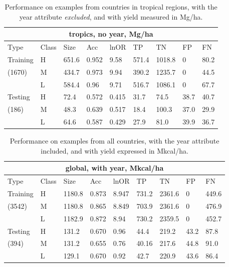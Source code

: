 \documentclass[12pt]{article}
\begin{document}
\begin{table}[h!]
\centering
\begin{tabular}{lllllllll}
\toprule
\multicolumn{9}{c}{\textbf{tropics, no year, Mg/ha}} \\
\midrule
Type & Class & Size & Acc & lnOR & TP & TN & FP & FN \\
\midrule
Training & H & 651.6 & 0.952 & 9.58 & 571.4 & 1018.8 & 0 & 80.2  \\
(1670) & M & 434.7 & 0.973 & 9.94 & 390.2 & 1235.7 & 0 & 44.5  \\
& L & 584.4 & 0.96 & 9.71 & 516.7 & 1086.1 & 0 & 67.7  \\
Testing & H & 72.4 & 0.572 & 0.415 & 31.7 & 74.5 & 38.7 & 40.7  \\
(186) & M & 48.3 & 0.639 & 0.517 & 18.4 & 100.3 & 37.0 & 29.9  \\
& L & 64.6 & 0.587 & 0.429 & 27.9 & 81.0 & 39.9 & 36.7  \\
\bottomrule
\end{tabular}
\caption{Performance on examples from countries in tropical regions, with the year attribute \emph{excluded}, and with yield measured in Mg/ha.}
\label{t.ny.trop_results}
\end{table}

\begin{table}[h!]
\centering
\begin{tabular}{lllllllll}
\toprule
\multicolumn{9}{c}{\textbf{global, with year, Mkcal/ha}} \\
\midrule
Type & Class & Size & Acc & lnOR & TP & TN & FP & FN \\
\midrule
Training & H & 1180.8 & 0.873 & 8.947 & 731.2 & 2361.6 & 0 & 449.6  \\
(3542) & M & 1180.8 & 0.865 & 8.849 & 703.9 & 2361.6 & 0 & 476.9  \\
& L & 1182.9 & 0.872 & 8.94 & 730.2 & 2359.5 & 0 & 452.7  \\
Testing & H & 131.2 & 0.670 & 0.96 & 44.4 & 219.2 & 43.2 & 87.8  \\
(394) & M & 131.2 & 0.655 & 0.76 & 40.16 & 217.6 & 44.8 & 91.0  \\
& L & 129.1 & 0.670 & 0.92 & 42.7 & 220.9 & 43.6 & 86.4  \\
\bottomrule
\end{tabular}
\caption{Performance on examples from all countries, with the year attribute included, and with yield expressed in Mkcal/ha.}
\label{k.wy.wt_results}
\end{table}
\end{document}
